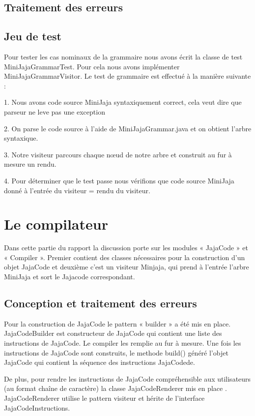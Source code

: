 \documentclass[a4paper,12pt]{report}
\begin{document}
\subsection{Traitement des erreurs  }
\subsection{Jeu de test}
Pour tester les cas nominaux de la grammaire nous avons écrit la classe de test MiniJajaGrammarTest. Pour cela nous avons implémenter MiniJajaGrammarVisitor. Le test de grammaire est effectué à la manière suivante : 

1. Nous avons code source MiniJaja syntaxiquement correct, cela veut dire que parseur ne leve pas une exception

2. On parse le code source à l'aide de MiniJajaGrammar.java et on obtient l'arbre syntaxique. 

3. Notre visiteur parcours chaque nœud de notre arbre et construit au fur à mesure un rendu. 

4. Pour déterminer que le test passe nous vérifions que code source MiniJaja donné à l'entrée du visiteur = rendu du visiteur.   

\section{Le compilateur}
Dans cette partie du rapport la discussion porte sur les modules  « JajaCode » et « Compiler ». Premier contient des classes nécessaires pour la construction d’un objet JajaCode et deuxième c’est un visiteur Minjaja, qui prend à l’entrée l’arbre MiniJaja et sort le Jajacode correspondant. 

\subsection{Conception et traitement des erreurs}
Pour la construction de JajaCode le pattern « builder » a été mis en place. JajaCodeBuilder est constructeur de JajaCode qui contient une liste des instructions de JajaCode. Le compiler les remplie au fur à mesure. Une fois les instructions de JajaCode sont construits, le methode build() généré l’objet JajaCode qui contient la séquence des instructions JajaCodede.
  
De plus, pour rendre les instructions de JajaCode compréhensible aux utilisateurs (au format chaîne de caractère) la classe JajaCodeRenderer mis en place . JajaCodeRenderer utilise le pattern visiteur et  hérite de l’interface JajaCodeInstructions. 
\end{document}
